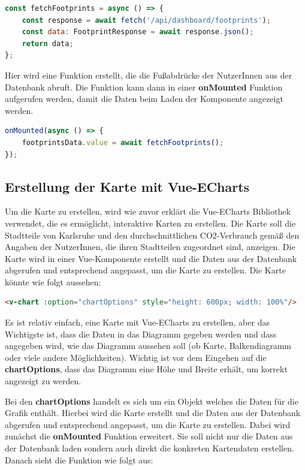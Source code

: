 \begin{lstlisting}[language={JavaScript}, caption={Laden der Fußabdrücke der NutzerInnen}]
const fetchFootprints = async () => {
    const response = await fetch('/api/dashboard/footprints');
    const data: FootprintResponse = await response.json();
    return data;
};
\end{lstlisting}

Hier wird eine Funktion erstellt, die die Fußabdrücke der NutzerInnen aus der Datenbank abruft. Die Funktion kann dann in einer \textbf{onMounted} Funktion aufgerufen werden, damit die Daten beim Laden der Komponente angezeigt werden.

\begin{lstlisting}[language={JavaScript}, caption={Bei laden der Komponente die Fußabdrücke der NutzerInnen speichern}]
onMounted(async () => {
    footprintsData.value = await fetchFootprints();
});
\end{lstlisting}

\subsection{Erstellung der Karte mit Vue-ECharts}

Um die Karte zu erstellen, wird wie zuvor erklärt die Vue-ECharts Bibliothek verwendet, die es ermöglicht, interaktive Karten zu erstellen. Die Karte soll die Stadtteile von Karlsruhe und den durchschnittlichen CO2-Verbrauch gemäß den Angaben der NutzerInnen, die ihren Stadtteilen zugeordnet sind, anzeigen. Die Karte wird in einer Vue-Komponente erstellt und die Daten aus der Datenbank abgerufen und entsprechend angepasst, um die Karte zu erstellen. Die Karte könnte wie folgt aussehen:

\begin{lstlisting}[language={html}, caption={Vue-ECharts Diagramm Beispiel}]
<v-chart :option="chartOptions" style="height: 600px; width: 100%"/>
\end{lstlisting}

Es ist relativ einfach, eine Karte mit Vue-ECharts zu erstellen, aber das Wichtigste ist, dass die Daten in das Diagramm gegeben werden und dass angegeben wird, wie das Diagramm aussehen soll (ob Karte, Balkendiagramm oder viele andere Möglichkeiten). Wichtig ist vor dem Eingehen auf die \textbf{chartOptions}, dass das Diagramm eine Höhe und Breite erhält, um korrekt angezeigt zu werden.

Bei den \textbf{chartOptions} handelt es sich um ein Objekt welches die Daten für die Grafik enthält. Hierbei wird die Karte erstellt und die Daten aus der Datenbank abgerufen und entsprechend angepasst, um die Karte zu erstellen. Dabei wird zunächst die \textbf{onMounted} Funktion erweitert. Sie soll nicht nur die Daten aus der Datenbank laden sondern auch direkt die konkreten Kartendaten erstellen. Danach sieht die Funktion wie folgt aus:

